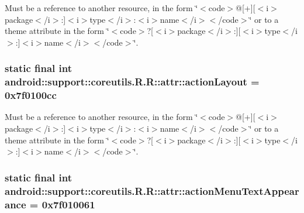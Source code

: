 Must be a reference to another resource, in the form \char`\"{}$<$code$>$@\mbox{[}+\mbox{]}\mbox{[}$<$i$>$package$<$/i$>$:\mbox{]}$<$i$>$type$<$/i$>$:$<$i$>$name$<$/i$>$$<$/code$>$\char`\"{} or to a theme attribute in the form \char`\"{}$<$code$>$?\mbox{[}$<$i$>$package$<$/i$>$:\mbox{]}\mbox{[}$<$i$>$type$<$/i$>$:\mbox{]}$<$i$>$name$<$/i$>$$<$/code$>$\char`\"{}. \hypertarget{classandroid_1_1support_1_1coreutils_1_1_r_1_1attr_8c11bf311950607447ce1579facbe665}{
\subsubsection[{actionLayout}]{\setlength{\rightskip}{0pt plus 5cm}static final int android::support::coreutils.R.R::attr::actionLayout = 0x7f0100cc}}
\label{classandroid_1_1support_1_1coreutils_1_1_r_1_1attr_8c11bf311950607447ce1579facbe665}


Must be a reference to another resource, in the form \char`\"{}$<$code$>$@\mbox{[}+\mbox{]}\mbox{[}$<$i$>$package$<$/i$>$:\mbox{]}$<$i$>$type$<$/i$>$:$<$i$>$name$<$/i$>$$<$/code$>$\char`\"{} or to a theme attribute in the form \char`\"{}$<$code$>$?\mbox{[}$<$i$>$package$<$/i$>$:\mbox{]}\mbox{[}$<$i$>$type$<$/i$>$:\mbox{]}$<$i$>$name$<$/i$>$$<$/code$>$\char`\"{}. \hypertarget{classandroid_1_1support_1_1coreutils_1_1_r_1_1attr_2bdd9f038abfb05d073c9c858088108b}{
\subsubsection[{actionMenuTextAppearance}]{\setlength{\rightskip}{0pt plus 5cm}static final int android::support::coreutils.R.R::attr::actionMenuTextAppearance = 0x7f010061}}
\label{classandroid_1_1support_1_1coreutils_1_1_r_1_1attr_2bdd9f038abfb05d073c9c858088108b}


